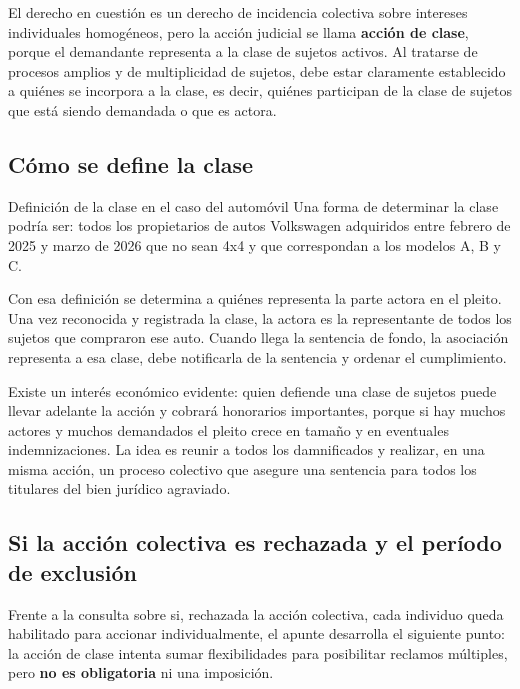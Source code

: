 \documentclass[12pt,oneside]{book}
\begin{document}
El derecho en cuestión es un derecho de incidencia colectiva sobre intereses individuales homogéneos, pero la acción judicial se llama \textbf{acción de clase}, porque el demandante representa a la clase de sujetos activos. Al tratarse de procesos amplios y de multiplicidad de sujetos, debe estar claramente establecido a quiénes se incorpora a la clase, es decir, quiénes participan de la clase de sujetos que está siendo demandada o que es actora.

\subsection{Cómo se define la clase}

\begin{example}{Definición de la clase en el caso del automóvil}
Una forma de determinar la clase podría ser: todos los propietarios de autos Volkswagen adquiridos entre febrero de 2025 y marzo de 2026 que no sean 4x4 y que correspondan a los modelos A, B y C.
\end{example}

Con esa definición se determina a quiénes representa la parte actora en el pleito. Una vez reconocida y registrada la clase, la actora es la representante de todos los sujetos que compraron ese auto. Cuando llega la sentencia de fondo, la asociación representa a esa clase, debe notificarla de la sentencia y ordenar el cumplimiento.

Existe un interés económico evidente: quien defiende una clase de sujetos puede llevar adelante la acción y cobrará honorarios importantes, porque si hay muchos actores y muchos demandados el pleito crece en tamaño y en eventuales indemnizaciones. La idea es reunir a todos los damnificados y realizar, en una misma acción, un proceso colectivo que asegure una sentencia para todos los titulares del bien jurídico agraviado.

\subsection{Si la acción colectiva es rechazada y el período de exclusión}

Frente a la consulta sobre si, rechazada la acción colectiva, cada individuo queda habilitado para accionar individualmente, el apunte desarrolla el siguiente punto: la acción de clase intenta sumar flexibilidades para posibilitar reclamos múltiples, pero \textbf{no es obligatoria} ni una imposición.
\end{document}
